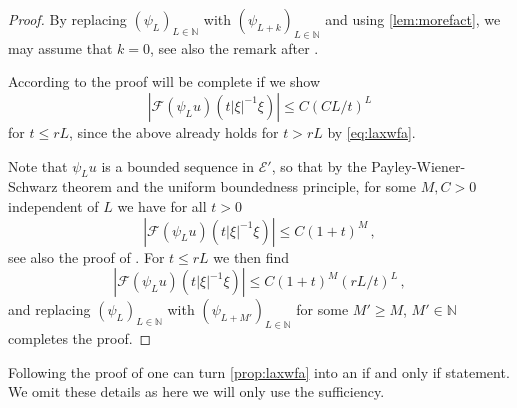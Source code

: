 \documentclass[
	fontsize=11pt, 
	twoside=false, 
	abstract=true, 
	a4paper,
]{scrartcl}
\newcommand{\RR}{\mathbb{R}}
\newcommand{\abs}[1]{\left\lvert#1\right\rvert}
\newcommand{\supp}{\mathrm{supp}}
\newcommand{\td}[1]{\tilde{#1}}
\newcommand{\wf}{\mathrm{WF}_{\mathrm{a}}}
\begin{document}
\begin{proof}
	By replacing $(\psi_L)_{L\in\mathbb{N}}$ with $(\psi_{L+k})_{L\in\mathbb{N}}$ and using \cref{lem:morefact}, we may assume that $k=0$, see also the remark after \cite[Prop.~2.4]{zbMATH03359011}. 

	According to \cite[Def.~8.4.3]{hoermander1} the proof will be complete if we show 
	\[
		\abs{\mathcal{F}(\psi_L u)(t\abs{\xi}^{-1}\xi)} \leq C(CL/t)^L
	\]
	for $t \leq rL$, since the above already holds for $t>rL$ by \cref{eq:laxwfa}.

	Note that $\psi_L u$ is a bounded sequence in $\mathcal{E}'$, so that by the Payley-Wiener-Schwarz theorem and the uniform boundedness principle, for some $M,C>0$ independent of $L$ we have for all $t>0$
	\[
			\abs{\mathcal{F}(\psi_L u)(t\abs{\xi}^{-1}\xi)} \leq C(1+t)^M\,,
	\]
	see also the proof of \cite[Prop.~8.4.2]{hoermander1}. For $t\leq rL$ we then find 
	\[
			\abs{\mathcal{F}(\psi_L u)(t\abs{\xi}^{-1}\xi)} \leq C(1+t)^M (rL/t)^L\,,
	\]
	and replacing $(\psi_L)_{L\in\mathbb{N}}$ with $(\psi_{L+M'})_{L\in\mathbb{N}}$ for some $M'\geq M$, $M' \in \mathbb{N}$ completes the proof.
%	
%
%
%
\end{proof}
Following the proof of \cite[Lem~8.4.4]{hoermander1} one can turn \cref{prop:laxwfa} into an if and only if statement. We omit these details as here we will only use the sufficiency.
\end{document}
